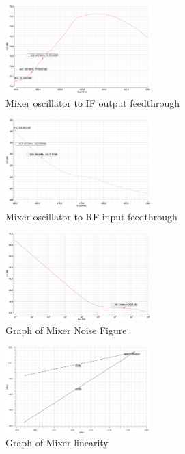 \begin{figure}[H]
   \centering
    \includegraphics[width=0.5\textwidth]{figures/MixerLO-IFfeed.png}
    \caption{Mixer oscillator to IF output feedthrough}
    \label{fig:loif}
\end{figure}

\begin{figure}[H]
   \centering
    \includegraphics[width=0.5\textwidth]{figures/MixerLO-RFfeed.png}
    \caption{Mixer oscillator to RF input feedthrough}
    \label{fig:lorf}
\end{figure}

\begin{figure}[H]
   \centering
    \includegraphics[width=0.5\textwidth]{figures/MixerNoiseFigure.png}
    \caption{Graph of Mixer Noise Figure}
    \label{fig:mixernoise}
\end{figure}

\begin{figure}[H]
   \centering
    \includegraphics[width=0.5\textwidth]{figures/mixerIIP3.png}
    \caption{Graph of Mixer linearity}
    \label{fig:mixerlin}
\end{figure}

